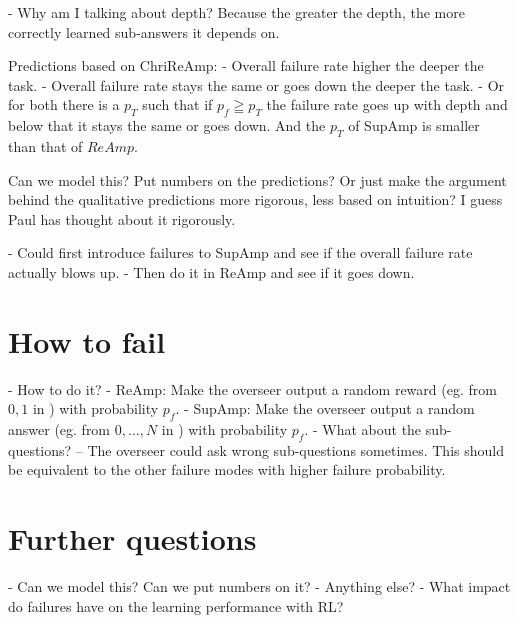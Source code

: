 \documentclass{farlamp}
\begin{document}
- Why am I talking about depth? Because the greater the depth, the more
correctly learned sub-answers it depends on.

Predictions based on ChriReAmp:
- Overall failure rate higher the deeper the task.
- Overall failure rate stays the same or goes down the deeper the task.
- Or for both there is a $p_T$ such that if $p_f \geqq p_T$ the failure rate
goes up with depth and below that it stays the same or goes down. And the $p_T$
of SupAmp is smaller than that of $ReAmp$.

\OQ Can we model this? Put numbers on the predictions? Or just make the
argument behind the qualitative predictions more rigorous, less based on
intuition? I guess Paul has thought about it rigorously.

- Could first introduce failures to SupAmp and see if the overall failure rate
actually blows up.
- Then do it in ReAmp and see if it goes down.


\section{How to fail}

- How to do it?
    - ReAmp: Make the overseer output a random reward (eg. from ${0,
    1}$ in ) with probability $p_f$.
    - SupAmp: Make the overseer output a random answer (eg. from ${0, …,
    N}$ in ) with probability $p_f$.
    - What about the sub-questions? – The overseer could ask wrong sub-questions
    sometimes. This should be equivalent to the other failure modes with higher
    failure probability.


\section{Further questions}

- Can we model this? Can we put numbers on it?
- Anything else?
    - What impact do failures have on the learning performance with RL?



\printbibliography
\end{document}
